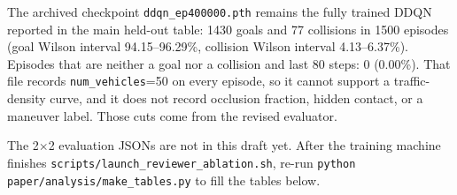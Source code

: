 The archived checkpoint \texttt{ddqn\_ep400000.pth} remains the fully trained DDQN reported in the main held-out table: 1430 goals and 77 collisions in 1500 episodes (goal Wilson interval 94.15--96.29\%, collision Wilson interval 4.13--6.37\%). Episodes that are neither a goal nor a collision and last 80 steps: 0 (0.00\%). That file records \texttt{num\_vehicles}=50 on every episode, so it cannot support a traffic-density curve, and it does not record occlusion fraction, hidden contact, or a maneuver label. Those cuts come from the revised evaluator.

The 2$\times$2 evaluation JSONs are not in this draft yet. After the training machine finishes \texttt{scripts/launch\_reviewer\_ablation.sh}, re-run \texttt{python paper/analysis/make\_tables.py} to fill the tables below.
